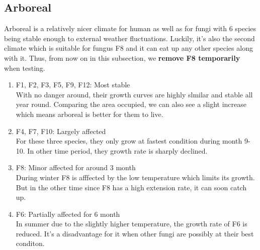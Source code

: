 \documentclass[a4paper,12pt]{article}
\begin{document}
\subsection{Arboreal}
Arboreal is a relatively nicer climate for human as well as for fungi with 6 species being stable enough to external weather fluctuations. Luckily, it's also the second climate which is suitable for fungus F8 and it can eat up any other species along with it. Thus, from now on in this subsection, we \textbf{remove F8 temporarily} when testing.
\begin{enumerate}
\setlength{\itemsep}{0ex} %
\item F1, F2, F3, F5, F9, F12:  Most stable \\
With no danger around, their growth curves are highly slmilar and stable all year round. Comparing the area occupied, we can also see a slight increase which means arboreal is better for them to live.
\item F4, F7, F10: Largely affected \\
For these three species, they only grow at fastest condition during month 9-10. In other time period, they growth rate is sharply declined.
\item F8: Minor affected for around 3 month\\
During winter F8 is afffected by the low temperature which limits its growth. But in the other time since F8 has a high extension rate, it can soon catch up.
\item F6: Partially affected for 6 month \\
In summer due to the slightly higher temperature, the growth rate of F6 is reduced. It's a disadvantage for it when other fungi are possibly at their best conditon.

\end{enumerate}
\end{document}
